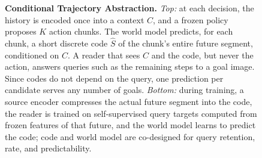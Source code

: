 \begin{figure}[t]
{}
\caption{\textbf{Conditional Trajectory Abstraction.}
\emph{Top:} at each decision, the history is encoded once into a context $C$, and a frozen policy proposes $K$ action chunks.
The world model predicts, for each chunk, a short discrete code $\hat S$ of the chunk's entire future segment, conditioned on $C$.
A reader that sees $C$ and the code, but never the action, answers queries such as the remaining steps to a goal image.
Since codes do not depend on the query, one prediction per candidate serves any number of goals.
\emph{Bottom:} during training, a source encoder compresses the actual future segment into the code, the reader is trained on self-supervised query targets computed from frozen features of that future, and the world model learns to predict the code; code and world model are co-designed for query retention, rate, and predictability.}
\label{fig:overview}
\end{figure}
